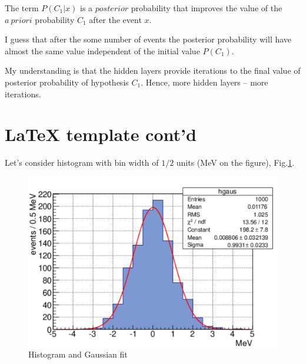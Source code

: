\documentclass[english, 12pt]{article}
\makeatletter
\def\ScaleIfNeeded{%
\ifdim\Gin@nat@width>\linewidth
\linewidth
\else
\Gin@nat@width
\fi
}
\makeatother
\begin{document}
The term $P(C_1|x)$ is a $posterior$ probability that improves the value of the $a\ priori$ probability $C_1$ after the event $x$.

I guess that after the some number of events the posterior probability will have almost the same value independent of the initial value $P(C_1)$.

My understanding is that the hidden layers provide iterations to the final value of posterior probability of hypothesis $C_1$.
Hence, more hidden layers -- more iterations.

\newpage

\section{LaTeX template cont'd}

Let's consider histogram with bin width of $1/2$ units (MeV on the figure), Fig.\ref{fig:hgaus}.

\begin{figure}[h]
\centering
\begin{minipage}[t]{1.0 \linewidth}
\includegraphics[width=\ScaleIfNeeded]{latex_template_pic}
\caption{Histogram and Gaussian fit}
\label{fig:hgaus}
\end{minipage}
\end{figure}
\end{document}
